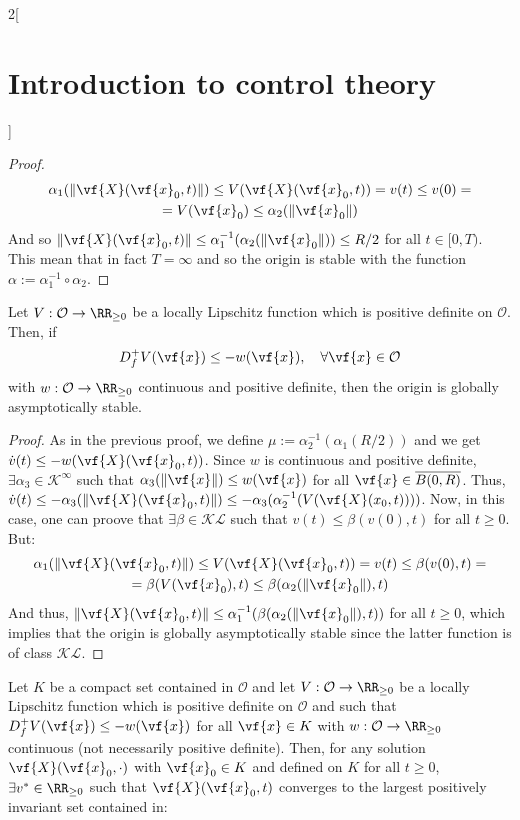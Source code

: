 \documentclass[../../../main_math.tex]{subfiles}
\begin{document}
\begin{multicols}{2}[\section{Introduction to control theory}]
\begin{proof}
    \begin{multline*}
      \alpha_1(\norm{\vf{X}(\vf{x}_0, t)})\leq V(\vf{X}(\vf{x}_0, t))=v(t) \leq v(0)=\\ = V(\vf{x}_0) \leq \alpha_2(\norm{\vf{x}_0})
    \end{multline*}
    And so $\norm{\vf{X}(\vf{x}_0, t)}\leq \alpha_1^{-1}(\alpha_2(\norm{\vf{x}_0}))\leq R/2$ for all $t\in[0, T)$. This mean that in fact $T=\infty$ and so the origin is stable with the function $\alpha:=\alpha_1^{-1}\circ\alpha_2$.
  \end{proof}
  \begin{theorem}
    Let $V:\mathcal{O}\to \RR_{\geq 0}$ be a locally Lipschitz function which is positive definite on $\mathcal{O}$. Then, if
    $$
      D_f^+V(\vf{x})\leq -w(\vf{x}), \quad \forall \vf{x}\in \mathcal{O}
    $$
    with $w:\mathcal{O}\to \RR_{\geq 0}$ continuous and positive definite, then the origin is globally asymptotically stable.
  \end{theorem}
  \begin{proof}
    As in the previous proof, we define $\mu:=\alpha_2^{-1}(\alpha_1(R/2))$ and we get $\dot{v}(t)\leq -w(\vf{X}(\vf{x}_0, t))$. Since $w$ is continuous and positive definite, $\exists \alpha_3\in\mathcal{K}^\infty$ such that $\alpha_3(\norm{\vf{x}})\leq w(\vf{x})$ for all $\vf{x}\in \overline{B(0,R)}$. Thus, $\dot{v}(t) \leq -\alpha_3(\norm{\vf{X}(\vf{x}_0, t)})\leq -\alpha_3(\alpha_2^{-1}(V(\vf{X}(x_0, t))))$. Now, in this case, one can proove that $\exists \beta \in \mathcal{KL}$ such that $v(t)\leq \beta(v(0), t)$ for all $t\geq 0$. But:
    \begin{multline*}
      \alpha_1(\norm{\vf{X}(\vf{x}_0, t)})\leq V(\vf{X}(\vf{x}_0, t))=v(t) \leq \beta(v(0), t)=\\ = \beta(V(\vf{x}_0), t)\leq \beta(\alpha_2(\norm{\vf{x}_0}), t)
    \end{multline*}
    And thus, $\norm{\vf{X}(\vf{x}_0, t)}\leq \alpha_1^{-1}(\beta(\alpha_2(\norm{\vf{x}_0}), t))$ for all $t\geq 0$, which implies that the origin is globally asymptotically stable since the latter function is of class $\mathcal{KL}$.
  \end{proof}
  \begin{theorem}
    Let $K$ be a compact set contained in $\mathcal{O}$ and let $V:\mathcal{O}\to \RR_{\geq 0}$ be a locally Lipschitz function which is positive definite on $\mathcal{O}$ and such that $D_f^+V(\vf{x})\leq -w(\vf{x})$ for all $\vf{x}\in K$ with $w:\mathcal{O}\to \RR_{\geq 0}$ continuous (not necessarily positive definite). Then, for any solution $\vf{X}(\vf{x}_0, \cdot)$ with $\vf{x}_0\in K$ and defined on $K$ for all $t\geq 0$, $\exists v^*\in\RR_{\geq 0}$ such that $\vf{X}(\vf{x}_0, t)$ converges to the largest positively invariant set contained in:

\end{theorem}
\end{multicols}
\end{document}
